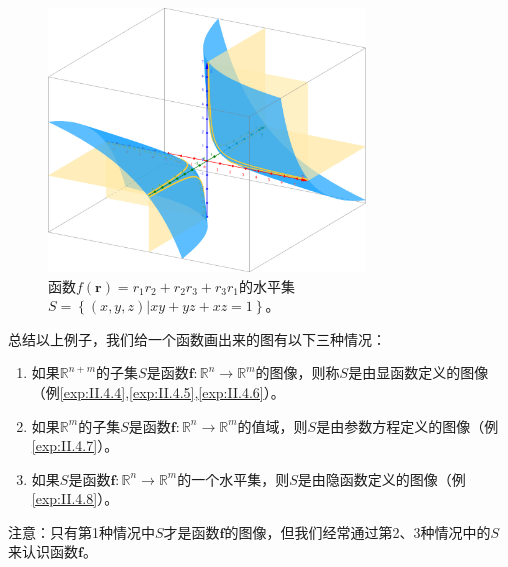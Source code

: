 \documentclass[main.tex]{subfiles}
\begin{document}
\begin{figure}[h]
    \centering
    \includegraphics[width=0.75\textwidth]{images/II.4.5.png}
    \caption{函数$f\left(\mathbf{r}\right)=r_1r_2+r_2r_3+r_3r_1$的水平集$S=\left\{\left(x,y,z\right)|xy+yz+xz=1\right\}$。}
    \label{fig:II.4.5}
\end{figure}
总结以上例子，我们给一个函数画出来的图有以下三种情况：
\begin{enumerate}
    \item 如果$\mathbb{R}^{n+m}$的子集$S$是函数$\mathbf{f}:\mathbb{R}^n\rightarrow\mathbb{R}^m$的图像，则称$S$是由显函数定义的图像（例\ref{exp:II.4.4},\ref{exp:II.4.5},\ref{exp:II.4.6}）。
    \item 如果$\mathbb{R}^{m}$的子集$S$是函数$\mathbf{f}:\mathbb{R}^n\rightarrow\mathbb{R}^m$的值域，则$S$是由参数方程定义的图像（例\ref{exp:II.4.7}）。
    \item 如果$S$是函数$\mathbf{f}:\mathbb{R}^n\rightarrow\mathbb{R}^m$的一个水平集，则$S$是由隐函数定义的图像（例\ref{exp:II.4.8}）。
\end{enumerate}

注意：只有第1种情况中$S$才是函数$\mathbf{f}$的图像，但我们经常通过第2、3种情况中的$S$来认识函数$\mathbf{f}$。
\end{document}
